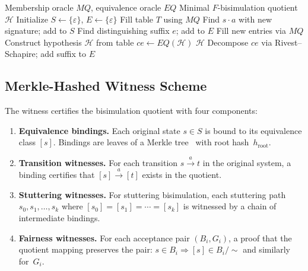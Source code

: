 \documentclass[11pt]{article}
\begin{document}
\begin{algorithm}[t]
\caption{Coalgebraic $L^*$ for Functor $F$}
\label{alg:lstar}
\begin{algorithmic}[1]
\Require Membership oracle $\mathit{MQ}$, equivalence oracle $\mathit{EQ}$
\Ensure Minimal $F$-bisimulation quotient $\mathcal{H}$
\State Initialize $S \gets \{\varepsilon\}$, $E \gets \{\varepsilon\}$
\State Fill table $T$ using $\mathit{MQ}$
\Loop
      \State Find $s \cdot a$ with new signature; add to $S$
    \EndIf
      \State Find distinguishing suffix $e$; add to $E$
    \EndIf
    \State Fill new entries via $\mathit{MQ}$
  \EndWhile
  \State Construct hypothesis $\mathcal{H}$ from table
  \State $\mathit{ce} \gets \mathit{EQ}(\mathcal{H})$
    \State \Return $\mathcal{H}$
  \EndIf
  \State Decompose $\mathit{ce}$ via Rivest--Schapire; add suffix to $E$
\EndLoop
\end{algorithmic}
\end{algorithm}

\subsection{Merkle-Hashed Witness Scheme}
\label{subsec:merkle}

The witness certifies the bisimulation quotient with four components:

\begin{enumerate}[nosep]
\item \textbf{Equivalence bindings.}  Each original state $s \in S$ is bound
  to its equivalence class $[s]$.  Bindings are leaves of a Merkle
  tree~\cite{Merkle87} with root hash~$h_{\mathrm{root}}$.

\item \textbf{Transition witnesses.}  For each transition $s \xrightarrow{a} t$
  in the original system, a binding certifies that
  $[s] \xrightarrow{a} [t]$ exists in the quotient.

\item \textbf{Stuttering witnesses.}  For stuttering bisimulation, each
  stuttering path $s_0, s_1, \ldots, s_k$ where
  $[s_0] = [s_1] = \cdots = [s_k]$ is witnessed by a chain of intermediate
  bindings.

\item \textbf{Fairness witnesses.}  For each acceptance pair $(B_i, G_i)$,
  a proof that the quotient mapping preserves the pair:
  $s \in B_i \Rightarrow [s] \in B_i/{\sim}$ and similarly for~$G_i$.
\end{enumerate}
\end{document}
